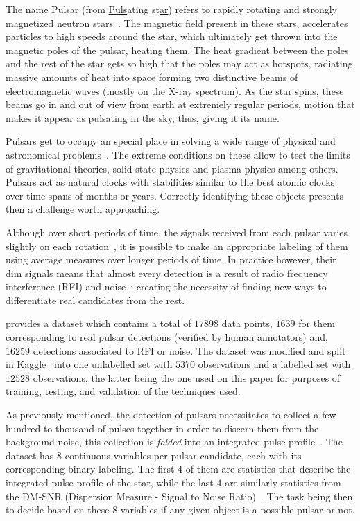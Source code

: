The name Pulsar (from \underline{Puls}ating st\underline{ar}) refers to rapidly
rotating and strongly magnetized neutron stars~\cite{pulsar:definition:nasa}.
The magnetic field present in these stars, accelerates particles to high speeds
around the star, which ultimately get thrown into the magnetic poles of the
pulsar, heating them. The heat gradient between the poles and the rest of the
star gets so high that the poles may act as hotspots, radiating massive amounts
of heat into space forming two distinctive beams of electromagnetic waves
(mostly on the X-ray spectrum). As the star spins, these beams go in and out of
view from earth at extremely regular periods, motion that makes it appear as
pulsating in the sky, thus, giving it its name.

Pulsars get to occupy an special place in solving a wide range of physical and
astronomical problems~\cite{pulsar:importance:kramer}. The extreme conditions on
these allow to test the limits of gravitational theories, solid state physics
and plasma physics among others. Pulsars act as natural clocks with stabilities
similar to the best atomic clocks over time-spans of months or years. Correctly
identifying these objects presents then a challenge worth approaching.

Although over short periods of time, the signals received from each pulsar
varies slightly on each rotation~\cite{pulsar:importance:kramer}, it is possible
to make an appropriate labeling of them using average measures over longer
periods of time. In practice however, their dim signals means that almost every
detection is a result of radio frequency interference (RFI) and
noise~\cite{pulsar:dataset:explanation:lyon}; creating the necessity of finding
new ways to differentiate real candidates from the rest.

\citet{pulsar:dataset:lyon} provides a dataset which contains a total of $17898$
data points, $1639$ for them corresponding to real pulsar detections (verified
by human annotators) and, $16259$ detections associated to RFI or noise. The
dataset was modified and split in Kaggle~\cite{pulsar:dataset:kaggle} into one
unlabelled set with $5370$ observations and a labelled set with $12528$
observations, the latter being the one used on this paper for purposes of
training, testing, and validation of the techniques used.

As previously mentioned, the detection of pulsars necessitates to collect a few
hundred to thousand of pulses together in order to discern them from the
background noise, this collection is \textit{folded} into an integrated pulse
profile~\cite{pulsar:importance:kramer}. The dataset has 8 continuous variables per
pulsar candidate, each with its corresponding binary labeling. The first $4$ of
them are statistics that describe the integrated pulse profile of the star,
while the last $4$ are similarly statistics from the DM-SNR (Dispersion Measure
- Signal to Noise Ratio)~\cite{pulsar:dataset:explanation:lyon}. The task being
then to decide based on these 8 variables if any given object is a possible
pulsar or not.

